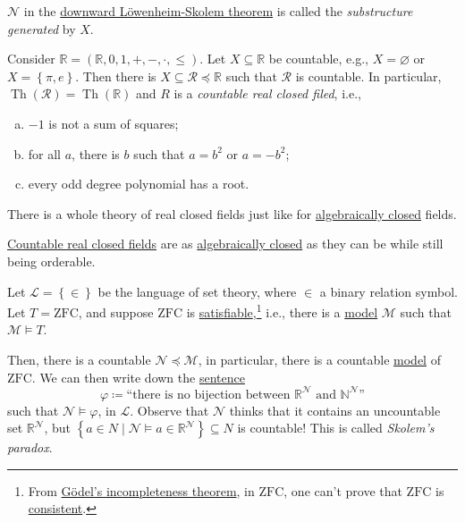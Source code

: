 \begin{notation}\label{not:generated-substructure}
	\(\mathcal{N} \) in the \hyperref[thm:downward-Lowenheim-Skolem]{downward Löwenheim-Skolem theorem} is called the \emph{substructure generated} by \(X\).
\end{notation}

\begin{eg}\label{eg:countable-real-closed-filed}
	Consider \(\mathbb{R} =(\mathbb{R} , 0, 1, +, -, \cdot, \leq )\). Let \(X \subseteq \mathbb{R} \) be countable, e.g., \(X = \varnothing \) or \(X = \left\{ \pi , e \right\} \). Then there is \(X \subseteq \mathcal{R} \preceq \mathbb{R} \) such that \(\mathcal{R}\) is countable. In particular, \(\mathop{\mathrm{Th}}(\mathcal{R} ) = \mathop{\mathrm{Th}}(\mathbb{R})\) and \(R\) is a \emph{countable real closed filed}, i.e.,
	\begin{enumerate}[(a)]
		\item \(-1\) is not a sum of squares;
		\item for all \(a\), there is \(b\) such that \(a = b^2\) or \(a=-b^2\);
		\item every odd degree polynomial has a root.
	\end{enumerate}
	There is a whole theory of real closed fields just like for \hyperref[def:algebraically-closed]{algebraically closed} fields.
\end{eg}

\begin{intuition}
	\hyperref[eg:countable-real-closed-filed]{Countable real closed fields} are as \hyperref[def:algebraically-closed]{algebraically closed} as they can be while still being orderable.
\end{intuition}

\begin{eg}
	Let \(\mathcal{L} = \left\{ \in\right\} \) be the language of set theory, where \(\in\) a binary relation symbol. Let \(T=\mathrm{ZFC} \), and suppose \(\mathrm{ZFC} \) is \hyperref[def:satisfiable]{satisfiable},\footnote{From \href{https://en.wikipedia.org/wiki/Gödel's_incompleteness_theorems}{Gödel's incompleteness theorem}, in \(\mathrm{ZFC} \), one can't prove that \(\mathrm{ZFC} \) is \hyperref[def:consistent]{consistent}.} i.e., there is a \hyperref[def:model]{model} \(\mathcal{M} \) such that \(\mathcal{M} \models T\).

	Then, there is a countable \(\mathcal{N} \preceq \mathcal{M} \), in particular, there is a countable \hyperref[def:model]{model} of \(\mathrm{ZFC} \). We can then write down the \hyperref[def:sentence]{sentence}
	\[
		\varphi \coloneqq \text{``there is no bijection between \(\mathbb{R} ^\mathcal{N} \) and \(\mathbb{N} ^\mathcal{N} \)''}
	\]
	such that \(\mathcal{N} \models \varphi \), in \(\mathcal{L} \). Observe that \(\mathcal{N} \) thinks that it contains an uncountable set \(\mathbb{R} ^\mathcal{N} \), but \(\left\{ a\in N \mid \mathcal{N} \models a\in \mathbb{R} ^\mathcal{N} \right\} \subseteq N\) is countable! This is called \emph{Skolem's paradox}.
\end{eg}

